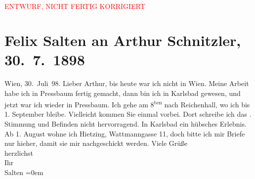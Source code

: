 
\begin{center}
            \textcolor{red}{ENTWURF, NICHT FERTIG KORRIGIERT}
                      \end{center}
            
         \renewcommand{\erwaehnteOrte}{Orte: Bad Reichenhall, Karlsbad, Pressbaum, Wattmanngasse, Wien, Österreich}
         \renewcommand{\erwaehnteWerke}{}
               \section[Felix Salten an Arthur Schnitzler, 30. 7. 1898]{ Felix Salten an Arthur Schnitzler, 30. 7. 1898}\nopagebreak{}\rehead{ }\begin{ledgroupsized}[t]{13cm}\normalsize\beginnumbering \toendnotes[C]{\smallbreak\pagebreak[2]} 
\toendnotes[C]{\smallbreak}\pstart
           {\pb}Wien, 30. Juli 98. \pend
           \pstart
           Lieber Arthur, bis heute war ich nicht in Wien. Meine Arbeit habe ich in Pressbaum fertig gemacht, dann bin ich in Karlsbad gewesen, und jetzt war ich wieder in Pressbaum. Ich gehe am 8\textsuperscript{ten} nach Reichenhall, wo ich bis 1.
                  September bleibe. Vielleicht kommen Sie einmal vorbei. Dort schreibe ich
               das \label{K_L03280-1v}\label{K_L03280-1h}. Stimmung und Befinden nicht hervorragend. In Karlsbad ein hübsches Erlebnis. Ab 1. August
               wohne ich Hietzing, Wattmanngasse 11, doch bitte
               ich mir Briefe nur hieher, damit sie mir nachgeschickt werden.\pend
           \pstart
           {\pb}Viele Grüße {\\[\baselineskip]}herzlichst
               {\\[\baselineskip]}Ihr {\\[\baselineskip]}\spacefill\mbox{Salten}\pend
           \leftskip=0em{}
         
         \endnumbering{}\end{ledgroupsized}\begin{anhang}\end{anhang}\newcommand{\dateiname}{L03280}\newcommand{\titel}{Felix Salten an Arthur Schnitzler, 30. 7. 1898}\newcommand{\editorInnen}{Martin Anton Müller und Laura Untner}
      